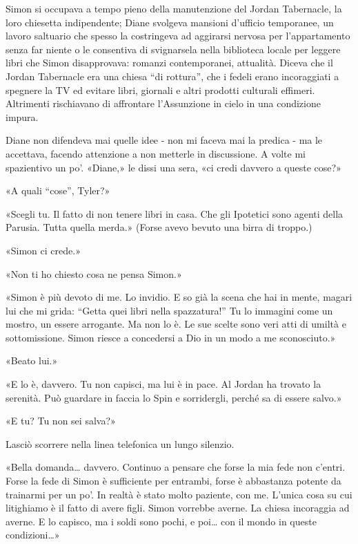 Simon si occupava a tempo pieno della manutenzione del Jordan
Tabernacle, la loro chiesetta indipendente; Diane svolgeva mansioni
d'ufficio temporanee, un lavoro saltuario che spesso la costringeva ad
aggirarsi nervosa per l'appartamento senza far niente o le consentiva di
svignarsela nella biblioteca locale per leggere libri che Simon
disapprovava: romanzi contemporanei, attualità. Diceva che il Jordan
Tabernacle era una chiesa ``di rottura'', che i fedeli erano
incoraggiati a spegnere la TV ed evitare libri, giornali e altri
prodotti culturali effimeri. Altrimenti rischiavano di affrontare
l'Assunzione in cielo in una condizione impura.

Diane non difendeva mai quelle idee - non mi faceva mai la predica - ma
le accettava, facendo attenzione a non metterle in discussione. A volte
mi spazientivo un po'. «Diane,» le dissi una sera, «ci credi davvero a
queste cose?»

«A quali ``cose'', Tyler?»

«Scegli tu. Il fatto di non tenere libri in casa. Che gli Ipotetici sono
agenti della Parusia. Tutta quella merda.» (Forse avevo bevuto una birra
di troppo.)

«Simon ci crede.»

«Non ti ho chiesto cosa ne pensa Simon.»

«Simon è più devoto di me. Lo invidio. E so già la scena che hai in
mente, magari lui che mi grida: ``Getta quei libri nella spazzatura!''
Tu lo immagini come un mostro, un essere arrogante. Ma non lo è. Le sue
scelte sono veri atti di umiltà e sottomissione. Simon riesce a
concedersi a Dio in un modo a me sconosciuto.»

«Beato lui.»

«E lo è, davvero. Tu non capisci, ma lui è in pace. Al Jordan ha trovato
la serenità. Può guardare in faccia lo Spin e sorridergli, perché sa di
essere salvo.»

«E tu? Tu non sei salva?»

Lasciò scorrere nella linea telefonica un lungo silenzio.

«Bella domanda\ldots{} davvero. Continuo a pensare che forse la mia fede
non c'entri. Forse la fede di Simon è sufficiente per entrambi, forse è
abbastanza potente da trainarmi per un po'. In realtà è stato molto
paziente, con me. L'unica cosa su cui litighiamo è il fatto di avere
figli. Simon vorrebbe averne. La chiesa incoraggia ad averne. E lo
capisco, ma i soldi sono pochi, e poi\ldots{} con il mondo in queste
condizioni\ldots»

